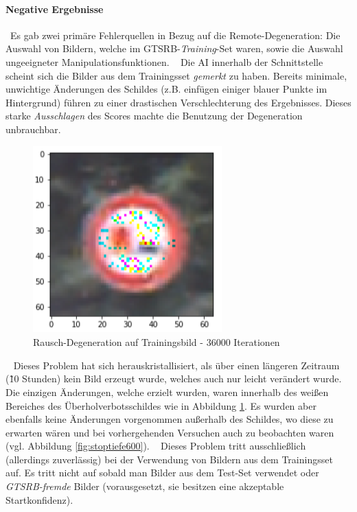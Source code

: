 \paragraph{Negative Ergebnisse} ~\newline Es gab zwei primäre Fehlerquellen in Bezug auf die Remote-Degeneration: Die Auswahl von Bildern, welche im GTSRB-\textit{Training}-Set waren, sowie die Auswahl ungeeigneter Manipulationsfunktionen. 
~\newline
Die AI innerhalb der Schnittstelle scheint sich die Bilder aus dem Trainingsset \textit{gemerkt} zu haben. Bereits minimale, unwichtige Änderungen des Schildes (z.B. einfügen einiger blauer Punkte im Hintergrund) führen zu einer drastischen Verschlechterung des Ergebnisses. Dieses starke \textit{Ausschlagen} des Scores machte die Benutzung der Degeneration unbrauchbar.
\begin{figure}[h]
	\centering
	\includegraphics[width=0.5\linewidth]{Images/DegenSamples/OverFitSmaller}
	\caption[Degeneration overfit]{Rausch-Degeneration auf Trainingsbild - 36000 Iterationen}
	\label{fig:DegenOverfit}
\end{figure}
~\newline
Dieses Problem hat sich herauskristallisiert, als über einen längeren Zeitraum (\~ 10 Stunden) kein Bild erzeugt wurde, welches auch nur leicht verändert wurde. Die einzigen Änderungen, welche erzielt wurden, waren innerhalb des weißen Bereiches des Überholverbotsschildes wie in Abbildung \ref{fig:DegenOverfit}. Es wurden aber ebenfalls keine Änderungen vorgenommen außerhalb des Schildes, wo diese zu erwarten wären und bei vorhergehenden Versuchen auch zu beobachten waren (vgl. Abbildung \ref{fig:stoptiefe600}). 
~\newline
Dieses Problem tritt ausschließlich (allerdings zuverlässig) bei der Verwendung von Bildern aus dem Trainingsset auf. Es tritt nicht auf sobald man Bilder aus dem Test-Set verwendet oder \textit{GTSRB-fremde} Bilder (vorausgesetzt, sie besitzen eine akzeptable Startkonfidenz). 

